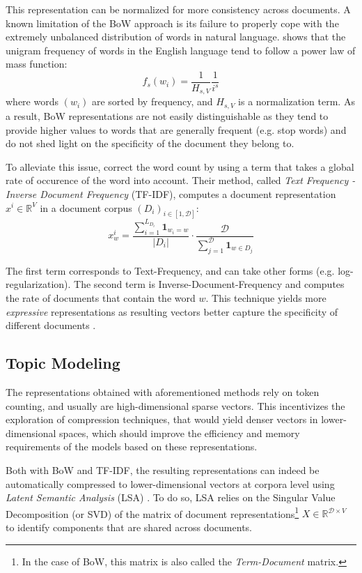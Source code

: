 This representation can be normalized for more consistency across documents. A known limitation of the BoW approach is its failure to properly cope with the extremely unbalanced distribution of words in natural language. \citet{zipf_psycho-biology_1935} shows that the unigram frequency of words in the English language tend to follow a power law of mass function:
$$
f_s(w_i) = \frac{1}{H_{s, V}} \frac{1}{i^s}
$$
where words $(w_i)$ are sorted by frequency, and $H_{s, V}$ is a normalization term. As a result, BoW representations are not easily distinguishable as they tend to provide higher values to words that are generally frequent (e.g. stop words) and do not shed light on the specificity of the document they belong to.

To alleviate this issue, \citet{tf_idf} correct the word count by using a term that takes a global rate of occurence of the word into account. Their method, called \textit{Text Frequency - Inverse Document Frequency} (TF-IDF), computes a document representation $x^i \in \mathbb{R}^V$ in a document corpus $(D_i)_{i \in [1, \mathcal{D}]}$:
$$
x^i_w = \frac{\sum_{i=1}^{L_{D_i}} \mathbf{1}_{w_i = w}}{|D_i|} \cdot \frac{\mathcal{D}}{\sum_{j=1}^{\mathcal{D}} \mathbf{1}_{w \in D_j}}
$$

The first term corresponds to Text-Frequency, and can take other forms (e.g. log-regularization). The second term is Inverse-Document-Frequency and computes the rate of documents that contain the word $w$. This technique yields more \textit{expressive} representations as resulting vectors better capture the specificity of different documents \citep{ramos2003using}.

\subsection{Topic Modeling}

The representations obtained with aforementioned methods rely on token counting, and usually are high-dimensional sparse vectors. This incentivizes the exploration of compression techniques, that would yield denser vectors in lower-dimensional spaces, which should improve the efficiency and memory requirements of the models based on these representations.

Both with BoW and TF-IDF, the resulting representations can indeed be automatically compressed to lower-dimensional vectors at corpora level using \textit{Latent Semantic Analysis} (LSA) \citep{deerwester1990indexing}. To do so, LSA relies on the Singular Value Decomposition (or SVD) of the matrix of document representations\footnote{In the case of BoW, this matrix is also called the \textit{Term-Document} matrix.} $X \in \mathbb{R}^{\mathcal{D} \times V}$ to identify components that are shared across documents.

